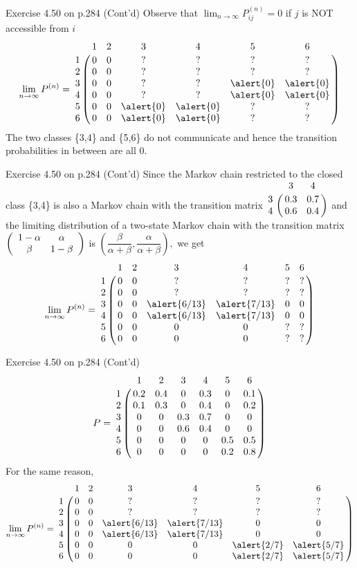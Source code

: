 \documentclass[letterpaper]{beamer}
\begin{document}
\begin{frame}{Exercise 4.50 on p.284 (Cont'd)}
Observe that
$\lim_{n\to\infty}P^{(n)}_{ij}=0$ if $j$ is NOT accessible from $i$
\[
\lim_{n\to\infty}P^{(n)}=
\bordermatrix{%
  &  1  &  2  &  3  &  4  &  5  &  6 \cr
1 & 0 & 0 &  ?  &  ?  &  ?  &  ? \cr
2 & 0 & 0 &  ?  &  ?  &  ?  &  ? \cr
3 & 0 & 0 &  ?  &  ?  & \alert{0} & \alert{0}\cr
4 & 0 & 0 &  ?  &  ?  & \alert{0} & \alert{0}\cr
5 & 0 & 0 & \alert{0} & \alert{0} &  ?  &  ? \cr
6 & 0 & 0 & \alert{0} & \alert{0} &  ?  &  ?
}
\]
The two classes \{3,4\} and \{5,6\} do not communicate
and hence the transition probabilities in between are all 0.
\end{frame}
\begin{frame}{Exercise 4.50 on p.284 (Cont'd)}
Since the Markov chain restricted to the closed class \{3,4\} is also a Markov chain
with the transition matrix
$
\bordermatrix{%
  &  3  &  4  \cr
3 & 0.3 & 0.7 \cr
4 & 0.6 & 0.4
}
$ and the limiting distribution of a two-state Markov chain
with the transition matrix
$\left(
\begin{array}{cc}
1-\alpha  & \alpha\cr
\beta & 1-\beta
\end{array}\right)
$
is $\left(\dfrac{\beta}{\alpha+\beta},\dfrac{\alpha}{\alpha+\beta}\right),$
we get
\[
\lim_{n\to\infty}P^{(n)}=
\bordermatrix{%
  &  1  &  2  &  3  &  4  &  5  &  6 \cr
1 & 0 & 0 &  ?  &  ?  &  ?  &  ? \cr
2 & 0 & 0 &  ?  &  ?  &  ?  &  ? \cr
3 & 0 & 0 & \alert{6/13} & \alert{7/13} & 0 & 0\cr
4 & 0 & 0 & \alert{6/13} & \alert{7/13} & 0 & 0\cr
5 & 0 & 0 & 0 & 0 &  ?  &  ? \cr
6 & 0 & 0 & 0 & 0 &  ?  &  ?
}
\]
\end{frame}
\begin{frame}{Exercise 4.50 on p.284 (Cont'd)}
\[
P=
\bordermatrix{%
  &  1  &  2  &  3  &  4  &  5  &  6 \cr
1 & 0.2 & 0.4 &  0  & 0.3 &  0  & 0.1\cr
2 & 0.1 & 0.3 &  0  & 0.4 &  0  & 0.2\cr
3 &  0  &  0  & 0.3 & 0.7 &  0  &  0 \cr
4 &  0  &  0  & 0.6 & 0.4 &  0  &  0 \cr
5 &  0  &  0  &  0  &  0  & 0.5 & 0.5\cr
6 &  0  &  0  &  0  &  0  & 0.2 & 0.8
}
\]
For the same reason,
\[
\lim_{n\to\infty}P^{(n)}=
\bordermatrix{%
  &  1  &  2  &  3  &  4  &  5  &  6 \cr
1 & 0 & 0 &  ?  &  ?  &  ?  &  ? \cr
2 & 0 & 0 &  ?  &  ?  &  ?  &  ? \cr
3 & 0 & 0 & \alert{6/13} & \alert{7/13} & 0 & 0\cr
4 & 0 & 0 & \alert{6/13} & \alert{7/13} & 0 & 0\cr
5 & 0 & 0 & 0 & 0 & \alert{2/7} & \alert{5/7} \cr
6 & 0 & 0 & 0 & 0 & \alert{2/7} & \alert{5/7}
}
\]
\end{frame}
\end{document}
